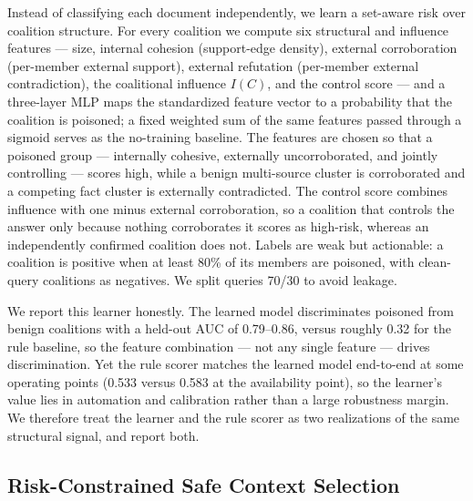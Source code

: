 \documentclass[sigconf]{acmart}
\begin{document}
Instead of classifying each document independently, we learn a set-aware risk over coalition structure. For every coalition we compute six structural and influence features --- size, internal cohesion (support-edge density), external corroboration (per-member external support), external refutation (per-member external contradiction), the coalitional influence $I(C)$, and the control score --- and a three-layer MLP maps the standardized feature vector to a probability that the coalition is poisoned; a fixed weighted sum of the same features passed through a sigmoid serves as the no-training baseline. The features are chosen so that a poisoned group --- internally cohesive, externally uncorroborated, and jointly controlling --- scores high, while a benign multi-source cluster is corroborated and a competing fact cluster is externally contradicted. The control score combines influence with one minus external corroboration, so a coalition that controls the answer only because nothing corroborates it scores as high-risk, whereas an independently confirmed coalition does not. Labels are weak but actionable: a coalition is positive when at least 80\% of its members are poisoned, with clean-query coalitions as negatives. We split queries 70/30 to avoid leakage.

We report this learner honestly. The learned model discriminates poisoned from benign coalitions with a held-out AUC of 0.79--0.86, versus roughly 0.32 for the rule baseline, so the feature combination --- not any single feature --- drives discrimination. Yet the rule scorer matches the learned model end-to-end at some operating points (0.533 versus 0.583 at the availability point), so the learner's value lies in automation and calibration rather than a large robustness margin. We therefore treat the learner and the rule scorer as two realizations of the same structural signal, and report both.

\subsection{Risk-Constrained Safe Context Selection}
\end{document}
